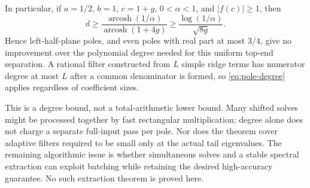 \documentclass[11pt]{article}
\theoremstyle{remark}
\begin{document}
In particular, if \(a=1/2\), \(b=1\), \(c=1+g\),
\(0<\alpha<1\), and \(|f(c)|\geq1\), then
\begin{equation}\label{eq:pole-degree}
 d\geq\frac{\operatorname{arcosh}(1/\alpha)}
                 {\operatorname{arcosh}(1+4g)}
   \geq\frac{\log(1/\alpha)}{\sqrt{8g}}.
\end{equation}
Hence left-half-plane poles, and even poles with real part at most \(3/4\),
give no improvement over the polynomial degree needed for this uniform
top-end separation. A rational filter constructed from \(L\) simple ridge
terms has numerator degree at most \(L\) after a common denominator is
formed, so \eqref{eq:pole-degree} applies regardless of coefficient sizes.

This is a degree bound, not a total-arithmetic lower bound. Many shifted
solves might be processed together by fast rectangular multiplication;
degree alone does not charge a separate full-input pass per pole. Nor does
the theorem cover adaptive filters required to be small only at the actual
tail eigenvalues. The remaining algorithmic issue is whether simultaneous
solves and a stable spectral extraction can exploit batching while retaining
the desired high-accuracy guarantee. No such extraction theorem is proved here.
\end{document}
